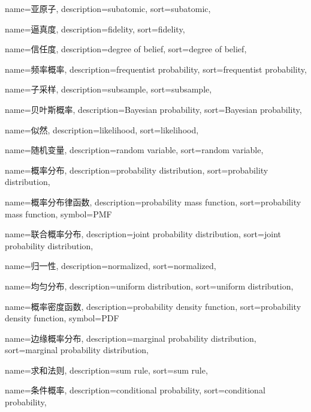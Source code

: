 {
  name=亚原子,
  description={subatomic},
  sort={subatomic},
}

{
  name=逼真度,
  description={fidelity},
  sort={fidelity},
}

{
  name=信任度,
  description={degree of belief},
  sort={degree of belief},
}

{
  name=频率概率,
  description={frequentist probability},
  sort={frequentist probability},
}

{
  name=子采样,
  description={subsample},
  sort={subsample},
}

{
  name=贝叶斯概率,
  description={Bayesian probability},
  sort={Bayesian probability},
}

{
  name=似然,
  description={likelihood},
  sort={likelihood},
}

{
  name=随机变量,
  description={random variable},
  sort={random variable},
}

{
  name=概率分布,
  description={probability distribution},
  sort={probability distribution},
}

{
  name=概率分布律函数,
  description={probability mass function},
  sort={probability mass function},
  symbol={PMF}
}

{
  name=联合概率分布,
  description={joint probability distribution},
  sort={joint probability distribution},
}

{
  name=归一性,
  description={normalized},
  sort={normalized},
}

{
  name=均匀分布,
  description={uniform distribution},
  sort={uniform distribution},
}

{
  name=概率密度函数,
  description={probability density function},
  sort={probability density function},
  symbol={PDF}
}

{
  name=边缘概率分布,
  description={marginal probability distribution},
  sort={marginal probability distribution},
}

{
  name=求和法则,
  description={sum rule},
  sort={sum rule},
}

{
  name=条件概率,
  description={conditional probability},
  sort={conditional probability},
}

